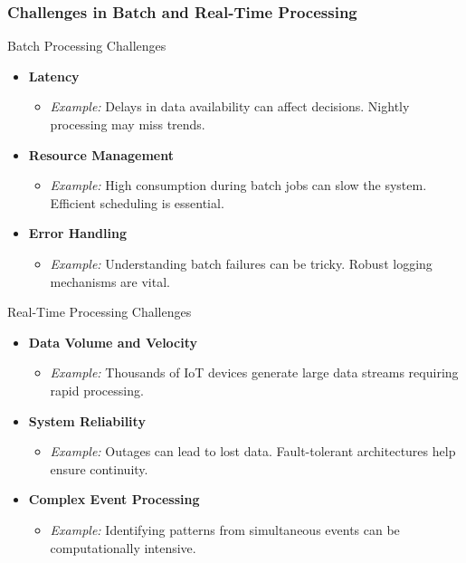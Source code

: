\documentclass[aspectratio=169]{beamer}
\begin{document}
\begin{frame}[fragile]
  \frametitle{Challenges in Batch and Real-Time Processing}
  \begin{block}{Batch Processing Challenges}
    \begin{itemize}
      \item \textbf{Latency}
        \begin{itemize}
          \item \textit{Example:} Delays in data availability can affect decisions. Nightly processing may miss trends.
        \end{itemize}
      \item \textbf{Resource Management}
        \begin{itemize}
          \item \textit{Example:} High consumption during batch jobs can slow the system. Efficient scheduling is essential.
        \end{itemize}
      \item \textbf{Error Handling}
        \begin{itemize}
          \item \textit{Example:} Understanding batch failures can be tricky. Robust logging mechanisms are vital.
        \end{itemize}
    \end{itemize}
  \end{block}
  
  \begin{block}{Real-Time Processing Challenges}
    \begin{itemize}
      \item \textbf{Data Volume and Velocity}
        \begin{itemize}
          \item \textit{Example:} Thousands of IoT devices generate large data streams requiring rapid processing.
        \end{itemize}
      \item \textbf{System Reliability}
        \begin{itemize}
          \item \textit{Example:} Outages can lead to lost data. Fault-tolerant architectures help ensure continuity.
        \end{itemize}
      \item \textbf{Complex Event Processing}
        \begin{itemize}
          \item \textit{Example:} Identifying patterns from simultaneous events can be computationally intensive.
        \end{itemize}
    \end{itemize}
  \end{block}
\end{frame}
\end{document}
